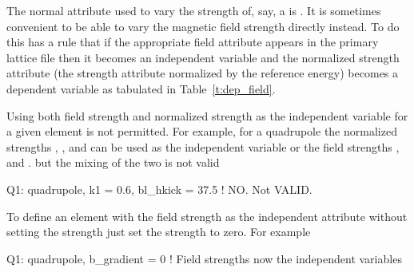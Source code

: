 The normal attribute used to vary the strength of, say, a
 is .  It is sometimes convenient to be able to
vary the magnetic field strength directly instead. To do this \bmad
has a rule that if the appropriate field attribute appears in the
primary lattice file then it becomes an independent variable and the
normalized strength attribute (the strength attribute normalized by
the reference energy) becomes a dependent variable as tabulated in
Table~\ref{t:dep_field}.
\begin{table}[h]
\caption {Field and Strength Attributes.}
\label{t:dep_field}
\end{table}
Using both field strength and normalized strength as the independent
variable for a given element is not permitted. For example, for a quadrupole the 
normalized strengths , , and  can be used as the
independent variable or the field strengths ,  and
. but the mixing of the two is not valid
\begin{example}
  Q1: quadrupole, k1 = 0.6, bl_hkick = 37.5  ! NO. Not VALID.
\end{example}
To define an element with the field strength as the independent
attribute without setting the strength just set the strength to zero. For example
\begin{example}
  Q1: quadrupole, b_gradient = 0   ! Field strengths now the independent variables
\end{example}


